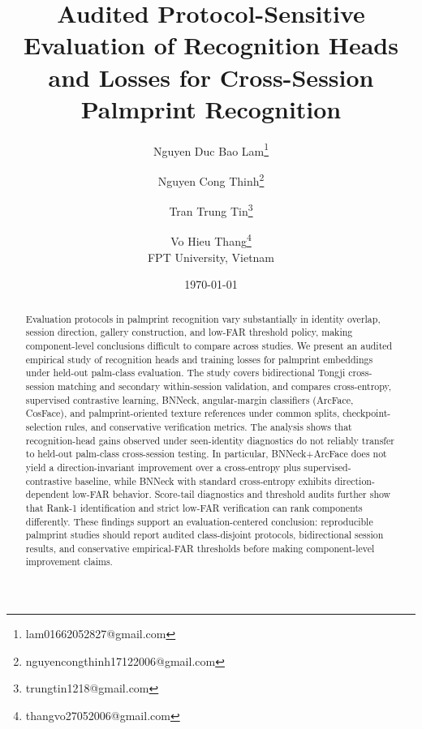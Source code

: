 \documentclass[10pt]{article}
\title{Audited Protocol-Sensitive Evaluation of Recognition Heads and Losses for Cross-Session Palmprint Recognition}
\author{%
  Nguyen Duc Bao Lam\thanks{lam01662052827@gmail.com} \and
  Nguyen Cong Thinh\thanks{nguyencongthinh17122006@gmail.com} \and
  Tran Trung Tin\thanks{trungtin1218@gmail.com} \and
  Vo Hieu Thang\thanks{thangvo27052006@gmail.com}\\[4pt]
  FPT University, Vietnam
}
\date{\today}
\begin{document}
\maketitle

\begin{abstract}
Evaluation protocols in palmprint recognition vary substantially in identity overlap, session direction, gallery construction, and low-FAR threshold policy, making component-level conclusions difficult to compare across studies. We present an audited empirical study of recognition heads and training losses for palmprint embeddings under held-out palm-class evaluation. The study covers bidirectional Tongji cross-session matching and secondary within-session validation, and compares cross-entropy, supervised contrastive learning, BNNeck, angular-margin classifiers (ArcFace, CosFace), and palmprint-oriented texture references under common splits, checkpoint-selection rules, and conservative verification metrics. The analysis shows that recognition-head gains observed under seen-identity diagnostics do not reliably transfer to held-out palm-class cross-session testing. In particular, BNNeck+ArcFace does not yield a direction-invariant improvement over a cross-entropy plus supervised-contrastive baseline, while BNNeck with standard cross-entropy exhibits direction-dependent low-FAR behavior. Score-tail diagnostics and threshold audits further show that Rank-1 identification and strict low-FAR verification can rank components differently. These findings support an evaluation-centered conclusion: reproducible palmprint studies should report audited class-disjoint protocols, bidirectional session results, and conservative empirical-FAR thresholds before making component-level improvement claims.
\end{abstract}




































\end{document}
